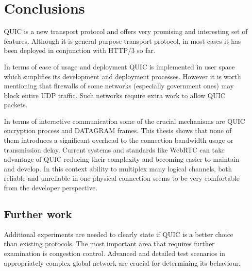 \chapter{Conclusions}
\label{ch:conclusions}
QUIC is a new transport protocol and offers very promising and interesting set of features.
Although it is general purpose transport protocol, in most cases it has been deployed in conjunction with HTTP/3 so far.

In terms of ease of usage and deployment QUIC is implemented in user space which simplifies its development and
deployment processes.
However it is worth mentioning that firewalls of some networks (especially government ones) may block entire UDP traffic.
Such networks require extra work to allow QUIC packets.

In terms of interactive communication some of the crucial mechanisms are QUIC encryption process and DATAGRAM frames.
This thesis shows that none of them introduces a significant overhead to the connection bandwidth usage or transmission delay.
Current systems and standards like WebRTC can take advantage of QUIC reducing their complexity and becoming easier to maintain and develop.
In this context ability to multiplex many logical channels, both reliable and unreliable in one physical connection seems to be
very comfortable from the developer perspective.

\section{Further work}
\label{sec:further-work}
Additional experiments are needed to clearly state if QUIC is a better choice than existing protocols.
The most important area that requires further examination is congestion control.
Advanced and detailed test scenarios in appropriately complex global network are crucial for determining its behaviour.
